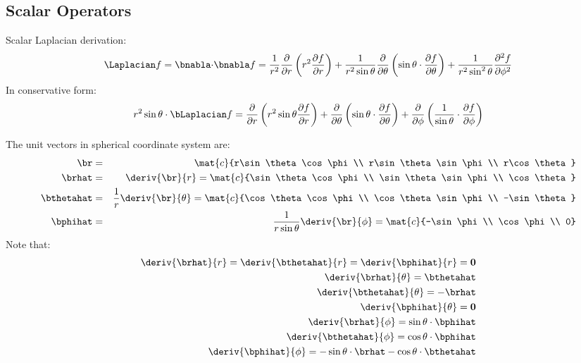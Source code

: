 \subsection{Scalar Operators}
Scalar Laplacian derivation:
\begin{eqnarray}
\Laplacian f = \bnabla \mathbf{\cdot} \bnabla f = \frac{1}{r^2}\frac{\partial}{\partial r}
\left( r^2 \frac{\partial f}{\partial r} \right) +
\frac{1}{r^2 \sin\theta} \frac{\partial}{\partial \theta} \left( \sin\theta \cdot \frac{\partial f}{\partial \theta}\right)
+ \frac{1}{r^2 \sin^2\theta} \frac{\partial^2 f}{\partial \phi^2}
\end{eqnarray}
In conservative form:
\begin{eqnarray}
r^2 \sin\theta \cdot \bLaplacian f = \frac{\partial}{\partial r} \left( r^2 \sin \theta \frac{\partial f}{\partial r} \right) +
\frac{\partial}{\partial \theta} \left( \sin\theta \cdot \frac{\partial f}{\partial \theta}\right) +
\frac{\partial}{\partial \phi} \left( \frac{1}{\sin\theta} \cdot \frac{\partial f}{\partial \phi}\right)
\end{eqnarray}

The unit vectors in spherical coordinate system are:
\begin{eqnarray}
 \br &=& \mat{c}{r\sin\theta \cos\phi \\ r\sin\theta \sin\phi \\ r\cos\theta} \\
 \brhat &=& \deriv{\br}{r}
 = \mat{c}{\sin\theta \cos\phi \\ \sin\theta \sin\phi \\ \cos\theta} \\
 \bthetahat &=& \frac{1}{r} \deriv{\br}{\theta}
 = \mat{c}{\cos\theta \cos\phi \\ \cos\theta \sin\phi \\ -\sin\theta} \\
 \bphihat &=& \frac{1}{r \sin \theta} \deriv{\br}{\phi}
 = \mat{c}{-\sin\phi \\ \cos\phi \\ 0}
\end{eqnarray}
Note that:
\begin{eqnarray}
  \deriv{\brhat}{r} = \deriv{\bthetahat}{r} = \deriv{\bphihat}{r} = \mathbf{0} \\
  \deriv{\brhat}{\theta} = \bthetahat \\
  \deriv{\bthetahat}{\theta} = -\brhat \\
  \deriv{\bphihat}{\theta} = \mathbf{0} \\
  \deriv{\brhat}{\phi} = \sin \theta \cdot \bphihat \\
  \deriv{\bthetahat}{\phi} = \cos \theta \cdot \bphihat \\
  \deriv{\bphihat}{\phi} = -\sin \theta \cdot \brhat -\cos \theta \cdot \bthetahat
\end{eqnarray}

